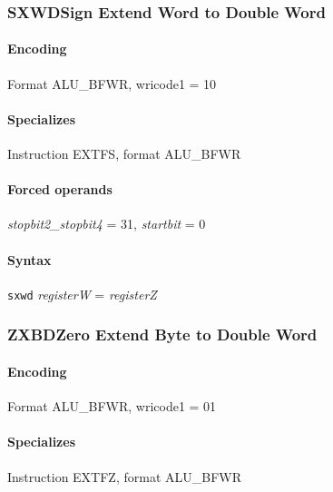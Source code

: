 {\subsubsection[{\small SXWD: Sign Extend Word to Double Word}]{SXWD\hfill Sign Extend Word to Double Word}
\label{instr:SXWD}

\paragraph{Encoding} Format \textsf{ALU\_BFWR, wricode1 = 10}\\



\paragraph{Specializes} Instruction EXTFS, format ALU\_BFWR

\paragraph{Forced operands} \emph{stopbit2\_stopbit4} = 31, \emph{startbit} = 0

\paragraph{Syntax} \texttt{sxwd} \emph{registerW} = \emph{registerZ}
\newpage
\subsubsection[{\small ZXBD: Zero Extend Byte to Double Word}]{ZXBD\hfill Zero Extend Byte to Double Word}
\label{instr:ZXBD}

\paragraph{Encoding} Format \textsf{ALU\_BFWR, wricode1 = 01}\\



\paragraph{Specializes} Instruction EXTFZ, format ALU\_BFWR

}
